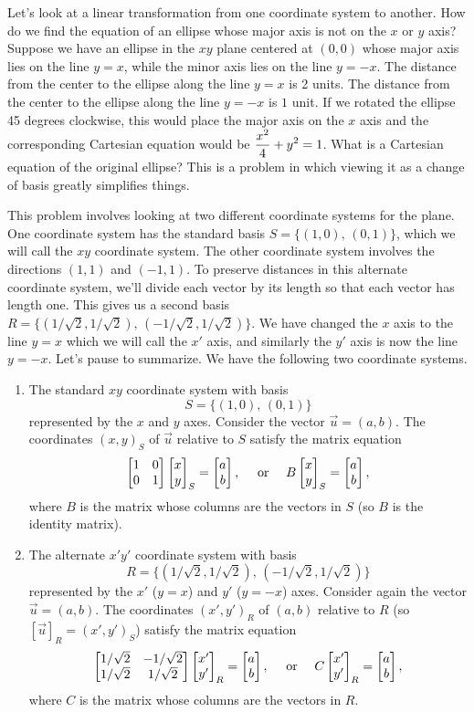 \begin{example}
Let's look at a linear transformation from one coordinate system to another. How do we find the equation of an ellipse whose major axis is not on the $x$ or $y$ axis?  
Suppose we have an ellipse in the $xy$ plane centered at $(0,0)$ whose major axis lies on the line $y=x$, while the minor axis lies on the line $y=-x$. 
The distance from the center to the ellipse along the line $y=x$ is 2 units.  
The distance from the center to the ellipse along the line $y=-x$ is $1$ unit.  
If we rotated the ellipse 45 degrees clockwise, this would place the major axis on the $x$ axis and the corresponding Cartesian equation would be $\displaystyle \frac{x^2}{4}+y^2=1$. 
What is a Cartesian equation of the original ellipse? 
This is a problem in which viewing it as a change of basis greatly simplifies things.

This problem involves looking at two different coordinate systems for the plane.  
One coordinate system has the standard basis $S = \{(1,0),\,(0,1)\}$, which we will call the $xy$ coordinate system.  
The other coordinate system involves the directions $(1,1)$ and $(-1,1)$. 
To preserve distances in this alternate coordinate system, we'll divide each vector by its length so that each vector has length one.  
This gives us a second basis $R=\{(1/\sqrt2,1/\sqrt{2}),\, (-1/\sqrt{2},1/\sqrt{2})\}$. 
We have changed the $x$ axis to the line $y=x$ which we will call the $x'$ axis, and similarly the $y'$ axis is now the line $y=-x$.  
Let's pause to summarize.  We have the following two coordinate systems.
\begin{enumerate}
	\item The standard $xy$ coordinate system with basis $$S=\{(1,0),\,(0,1)\}$$ represented by the $x$ and $y$ axes. 
	Consider the vector $\vec u = (a,b)$.  The coordinates $(x,y)_S$ of $\vec u$ relative to $S$ satisfy the matrix equation 
        $$\begin{bmatrix} 1&0\\0&1 \end{bmatrix}\begin{bmatrix} x\\y \end{bmatrix}_{S}=\begin{bmatrix} a\\b \end{bmatrix},\quad \text{ or } \quad B\begin{bmatrix} x\\y \end{bmatrix}_{S}=\begin{bmatrix} a\\b \end{bmatrix},$$
        where $B$ is the matrix whose columns are the vectors in $S$ (so $B$ is the identity matrix).
	\item The alternate $x'y'$ coordinate system with basis $$R=\{(1/\sqrt2,1/\sqrt{2}),\, (-1/\sqrt{2},1/\sqrt{2})\}$$ represented by the $x'$ ($y=x$) and $y'$ ($y=-x$) axes.
	Consider again the vector $\vec u = (a,b)$.  The coordinates $(x',y')_{R}$ of $(a,b)$ relative to $R$ (so $[\vec u]_{R} = (x',y')_S$) satisfy the matrix equation 
	$$\begin{bmatrix} 1/\sqrt2 &-1/\sqrt2\\1/\sqrt2&1/\sqrt2 \end{bmatrix}\begin{bmatrix} x'\\y' \end{bmatrix}_{R}=\begin{bmatrix} a\\b \end{bmatrix}, \quad \text{ or }\quad C\begin{bmatrix} x'\\y' \end{bmatrix}_{R}=\begin{bmatrix} a\\b \end{bmatrix},$$ where $C$ is the matrix whose columns are the vectors in $R$.
\end{enumerate}


\end{example}
